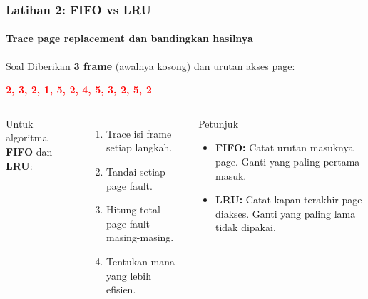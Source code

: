 \documentclass[t,aspectratio=169,xcolor=dvipsnames]{beamer}
\newcommand{\tem}[1]{\textbf{\textcolor{red}{#1}}}
\begin{document}
\begin{frame}
    \frametitle{Latihan 2: FIFO vs LRU}
    \framesubtitle{Trace page replacement dan bandingkan hasilnya}
    \footnotesize

    \begin{block}{Soal}
        Diberikan \textbf{3 frame} (awalnya kosong) dan urutan akses page:

        \vspace{0.1cm}
        \centering\tem{2, 3, 2, 1, 5, 2, 4, 5, 3, 2, 5, 2}
    \end{block}

    \vspace{0.15cm}
    \begin{columns}[T]
        Untuk algoritma \textbf{FIFO} dan \textbf{LRU}:
        \begin{enumerate}
            \item Trace isi frame setiap langkah.
            \item Tandai setiap page fault.
            \item Hitung total page fault masing-masing.
            \item Tentukan mana yang lebih efisien.
        \end{enumerate}

        \begin{alertblock}{Petunjuk}
            \begin{itemize}
                \item \textbf{FIFO:} Catat urutan masuknya page. Ganti yang paling pertama masuk.
                \item \textbf{LRU:} Catat kapan terakhir page diakses. Ganti yang paling lama tidak dipakai.
            \end{itemize}
        \end{alertblock}
    \end{columns}
\end{frame}
\end{document}
